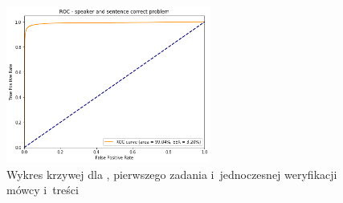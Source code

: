 \begin{figure}[H]
    \centering
    \includegraphics[width=0.6\textwidth]{images/4_3_gmm_roc_both}
    \caption{Wykres krzywej  dla , pierwszego zadania  i~jednoczesnej weryfikacji mówcy i~treści}
    \label{fig:4_3_gmm_roc_both}
\end{figure}

